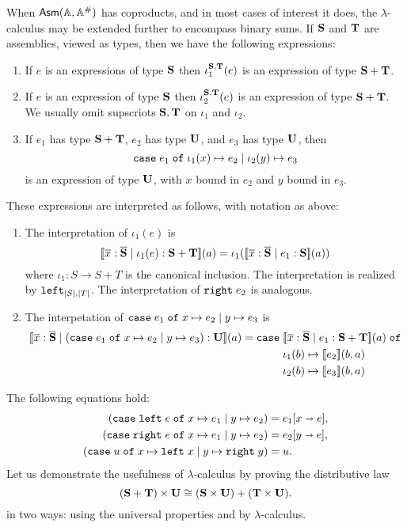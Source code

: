 When $\mathsf{Asm}(\mathbb{A},\mathbb{A}^{\#})$ has coproducts, and in most cases of interest it does,
the $\lambda$-calculus may be extended further to encompass binary
sums. If $\mathbf{S}$ and $\mathbf{T}$ are assemblies, viewed as types, then
we have the following expressions:
%
\begin{enumerate}
\item If $e$ is an expressions of type $\mathbf{S}$ then
  $\iota_1^{\mathbf{S},\mathbf{T}}(e)$ is an expression of type $\mathbf{S} +
  \mathbf{T}$.
\item If $e$ is an expression of type $\mathbf{S}$ then
  $\iota_2^{\mathbf{S},\mathbf{T}}(e)$ is an expression of type $\mathbf{S} +
  \mathbf{T}$. We usually omit supscriots $\mathbf{S}, \mathbf{T}$ on $\iota_1$
  and $\iota_2$.
\item If $e_1$ has type $\mathbf{S} + \mathbf{T}$, $e_2$ has type $\mathbf{U}$,
  and $e_3$ has type $\mathbf{U}$, then
  \begin{equation*}
    \mathtt{case}\;e_1\;\mathtt{of}\;\iota_1(x) \mapsto e_2 \mid \iota_2(y) \mapsto e_3
  \end{equation*}
  is an expression of type $\mathbf{U}$, with $x$ bound in $e_2$ and
  $y$ bound in $e_3$.
\end{enumerate}
%
These expressions are interpreted as follows, with notation as above:
%
\begin{enumerate}
\item The interpretation of $\iota_1(e)$ is
  \begin{equation*}
    [\![\overline{x} : \overline{\mathbf{S}} \mid
      \iota_1(e) : \mathbf{S} + \mathbf{T}]\!](a) =
    \iota_1 ([\![\overline{x} : \overline{\mathbf{S}} \mid e_1 : \mathbf{S}]\!](a))
  \end{equation*}
  where $\iota_1 : S \to S + T$ is the canonical inclusion. The
  interpretation is realized by $\mathtt{left}_{|S|,|T|}$. The
  interpretation of $\mathtt{right}\;e_2$ is analogous.
\item The interpetation of $\mathtt{case}\;e_1\;\mathtt{of}\;x \mapsto e_2 \mid y \mapsto e_3$ is
  \begin{equation*}
    \sem{\overline{x} : \overline{\asm{S}} \ctx
      (\case{e_1}{x}{e_2}{y}{e_3}) : \asm{U}}(a) =
    \xcase
    {\sem{\overline{x} : \overline{\asm{S}} \ctx e_1 : \asm{S} + \asm{T}}(a)}
    {\iota_1(b)}{\sem{e_2}(b,a)}
    {\iota_2(b)}{\sem{e_3}(b,a)}
  \end{equation*}
\end{enumerate}

The following equations hold:
%
\begin{align*}
  (\mathtt{case}\;\mathtt{left}\;e\;\mathtt{of}\;x \mapsto e_1 \mid y \mapsto e_2) &=
  e_1[x \shortrightarrow e], \\
  (\mathtt{case}\;\mathtt{right}\;e\;\mathtt{of}\;x \mapsto e_1 \mid y \mapsto e_2) &=
  e_2[y \shortrightarrow e], \\
  (\mathtt{case}\;u\;\mathtt{of}\;x \mapsto \mathtt{left}\;x \mid y \mapsto \mathtt{right}\;y) &= u.
\end{align*}
%
Let us demonstrate the usefulness of $\lambda$-calculus by proving the
distributive law
%
\begin{equation*}
  (\mathbf{S} + \mathbf{T}) \times \mathbf{U} \cong
  (\mathbf{S} \times \mathbf{U}) + (\mathbf{T} \times \mathbf{U}).
\end{equation*}
%
in two ways: using the universal properties and by $\lambda$-calculus.

